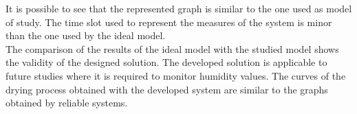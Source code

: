 It is possible to see that the represented graph is similar to the one used as model of study. The time slot used to represent the measures of the system is minor than the one used by the ideal model.\\

The comparison of the results of the ideal model with the studied model shows the validity of the designed solution. The developed solution is applicable to future studies where it is required to monitor humidity values. The curves of the drying process obtained with the developed system are similar to the graphs obtained by reliable systems.\\

\newpage
\newpage

